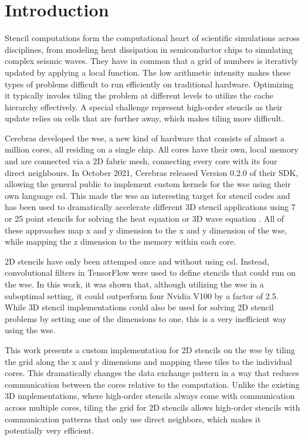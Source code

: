 \chapter{Introduction}
Stencil computations form the computational heart of scientific simulations across disciplines, from modeling heat dissipation in semiconductor chips to simulating complex seismic waves.
They have in common that a grid of numbers is iterativly updated by applying a local function.
The low arithmetic intensity makes these types of problems difficult to run efficiently on traditional hardware.
Optimizing it typically involes tiling the problem at different levels to utilize the cache hierarchy effectively.
A special challenge represent high-order stencils as their update relies on cells that are further away, which makes tiling more difficult.

Cerebras developed the \ac{wse}, a new kind of hardware that consists of almost a million cores, all residing on a single chip.
All cores have their own, local memory and are connected via a 2D fabric mesh, connecting every core with its four direct neighbours.
In October 2021, Cerebras released Version 0.2.0 of their SDK, allowing the general public to implement custom kernels for the \ac{wse} using their own language \ac{csl}. 
This made the \ac{wse} an interesting target for stencil codes and has been used to dramatically accelerate different 3D stencil applications using 7 or 25 point stencils for solving the heat equation or 3D wave equation \cite{jacquelin2022massively,rocki2020fast,woo2022disruptive,sai2024matrix}.
All of these approaches map x and y dimension to the x and y dimension of the \ac{wse}, while mapping the z dimension to the memory within each core.

2D stencils have only been attemped once and without using \ac{csl}. Instead, convolutional filters in TensorFlow were used to define stencils that could run on the \ac{wse}\cite{brown2022tensorflow}. In this work, it was shown that, although utilizing the \ac{wse} in a suboptimal setting, it could outperform four Nvidia V100 by a factor of 2.5. While 3D stencil implementations could also be used for solving 2D stencil problems by setting one of the dimensions to one, this is a very inefficient way using the \ac{wse}.

This work presents a custom implementation for 2D stencils on the \ac{wse} by tiling the grid along the x and y dimensions and mapping these tiles to the individual cores.
This dramatically changes the data exchange pattern in a way that reduces communication between the cores relative to the computation.
Unlike the existing 3D implementations, where high-order stencils always come with communication across multiple cores, tiling the grid for 2D stencils allows high-order stencils with communication patterns that only use direct neighbors, which makes it potentially very efficient.

